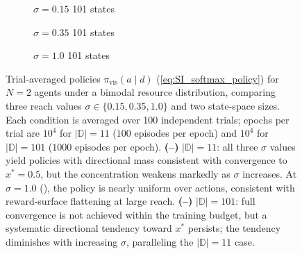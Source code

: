 \documentclass{article}
\begin{document}
\begin{figure}[ht!]
                        
                        \begin{subfigure}[b]{0.3\linewidth}
                            \centering
                            
                            \caption{$\sigma=0.15$ 101 states }  
                            \label{fig:qlearn_reach:d} 
                            \vspace{4ex}
                        \end{subfigure}
                        \begin{subfigure}[b]{0.3\linewidth}
                            \centering
                            
                            \caption{$\sigma=0.35$ 101 states} 
                            \label{fig:qlearn_reach:e} 
                            \vspace{4ex}
                        \end{subfigure}
                        \begin{subfigure}[b]{0.3\linewidth}
                            \centering
                            
                            \caption{$\sigma=1.0$ 101 states } 
                            \label{fig:qlearn_reach:f}
                            \vspace{4ex}
                        \end{subfigure} 
                        
                        \caption{Trial-averaged policies $\pi_{\mathrm{vis}}(a\mid d)$ (\cref{eq:SI_softmax_policy}) for $N=2$ agents under a bimodal resource distribution, comparing three reach values $\sigma \in \{0.15, 0.35, 1.0\}$ and two state-space sizes. Each condition is averaged over 100 independent trials; epochs per trial are $10^4$ for $|\mathbb{D}|=11$ ($100$ episodes per epoch) and $10^4$ for $|\mathbb{D}|=101$ ($1000$ episodes per epoch). \textbf{(--)} $|\mathbb{D}|=11$: all three $\sigma$ values yield policies with directional mass consistent with convergence to $x^*=0.5$, but the concentration weakens markedly as $\sigma$ increases. At $\sigma=1.0$ (), the policy is nearly uniform over actions, consistent with reward-surface flattening at large reach. \textbf{(--)} $|\mathbb{D}|=101$: full convergence is not achieved within the training budget, but a systematic directional tendency toward $x^*$ persists; the tendency diminishes with increasing $\sigma$, paralleling the $|\mathbb{D}|=11$ case.}
                        \label{fig:qlearn_reach}
                    \end{figure}
    
\end{document}
